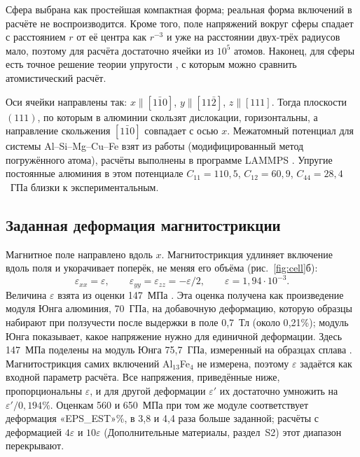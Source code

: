 \documentclass[11pt,a4paper]{article}
\begin{document}
Сфера выбрана как простейшая компактная форма; реальная форма включений
в расчёте не воспроизводится. Кроме того, поле
напряжений вокруг сферы спадает с расстоянием $r$ от её центра как
$r^{-3}$ и уже на расстоянии двух-трёх радиусов мало, поэтому для расчёта
достаточно ячейки из $10^5$ атомов. Наконец, для сферы есть точное решение теории
упругости \cite{Eshelby1957,Mura1987}, с которым можно сравнить
атомистический расчёт.

Оси ячейки направлены так: $x\parallel[1\bar10]$, $y\parallel[11\bar2]$,
$z\parallel[111]$. Тогда плоскости $(111)$, по которым в алюминии
скользят дислокации, горизонтальны, а направление скольжения
$[1\bar10]$ совпадает с осью $x$. Межатомный потенциал для системы
Al--Si--Mg--Cu--Fe взят из работы \cite{Jelinek2012} (модифицированный
метод погружённого атома), расчёты выполнены в программе LAMMPS
\cite{Thompson2022LAMMPS}. Упругие постоянные алюминия в этом
потенциале $C_{11}=110{,}5$, $C_{12}=60{,}9$, $C_{44}=28{,}4$~ГПа
близки к экспериментальным.

\subsection{Заданная деформация магнитострикции}
\label{sec:strain}

Магнитное поле направлено вдоль $x$. Магнитострикция удлиняет
включение вдоль поля и укорачивает поперёк, не меняя его объёма
(рис.~\ref{fig:cell}б):
\begin{equation}
\varepsilon_{xx}=\varepsilon,\qquad
\varepsilon_{yy}=\varepsilon_{zz}=-\varepsilon/2,\qquad
\varepsilon=1{,}94\cdot10^{-3}.
\label{eq:strain}
\end{equation}
Величина $\varepsilon$ взята из оценки 147~МПа \cite{Friha2024JMMM}. Эта
оценка получена как произведение модуля Юнга алюминия, 70~ГПа, на
добавочную деформацию, которую образцы набирают при ползучести после
выдержки в поле 0{,}7~Тл (около 0{,}21\%); модуль Юнга показывает,
какое напряжение нужно для единичной деформации. Здесь 147~МПа поделены
на модуль Юнга 75{,}7~ГПа, измеренный на образцах сплава
\cite{Pshonkin2025ZL}. Магнитострикция самих включений Al$_{13}$Fe$_4$ не
измерена, поэтому $\varepsilon$ задаётся как входной параметр расчёта. Все
напряжения, приведённые ниже, пропорциональны $\varepsilon$, и для другой
деформации $\varepsilon'$ их достаточно умножить на $\varepsilon'/0{,}194\%$.
Оценкам 560 и 650~МПа \cite{Skvortsov2019JAP,Friha2023PSS} при том же
модуле соответствует деформация «EPS_EST»\%, в 3{,}8 и 4{,}4 раза больше
заданной; расчёты с деформацией $4\varepsilon$ и $10\varepsilon$
(Дополнительные материалы, раздел~S2) этот диапазон перекрывают.
\end{document}
